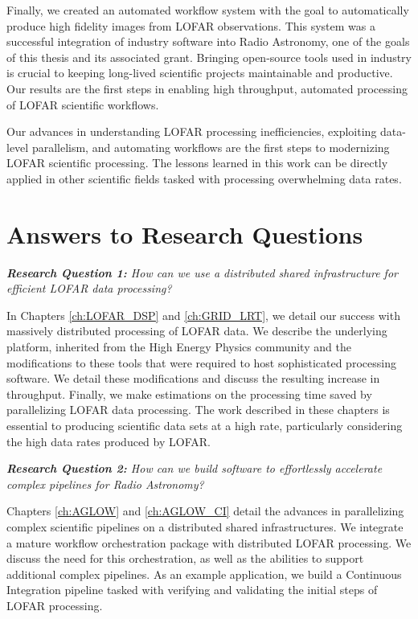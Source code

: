 Finally, we created an automated workflow system with the goal to automatically produce high fidelity images from LOFAR observations. This system was a successful integration of industry software into Radio Astronomy, one of the goals of this thesis and its associated grant. Bringing open-source tools used in industry is crucial to keeping long-lived scientific projects maintainable and productive. Our results are the first steps in enabling high throughput, automated processing of LOFAR scientific workflows. 

Our advances in understanding LOFAR processing inefficiencies, exploiting data-level parallelism, and automating workflows are the first steps to modernizing LOFAR scientific processing. The lessons learned in this work can be directly applied in other scientific fields tasked with processing overwhelming data rates. 

\section{Answers to Research Questions}


\begin{addmargin}[4em]{8em}%
    \emph{\textbf{Research Question 1:} How can we use a distributed shared infrastructure for efficient LOFAR data processing?}
\end{addmargin}

In Chapters \ref{ch:LOFAR_DSP} and \ref{ch:GRID_LRT}, we detail our success with massively distributed processing of LOFAR data. We describe the underlying platform, inherited from the High Energy Physics community and the modifications to these tools that were required to host sophisticated processing software. We detail these modifications and discuss the resulting increase in throughput. Finally, we make estimations on the processing time saved by parallelizing LOFAR data processing. The work described in these chapters is essential to producing scientific data sets at a high rate, particularly considering the high data rates produced by LOFAR. 


\begin{addmargin}[4em]{8em}%
    \emph{\textbf{Research Question 2:}  How can we build software to effortlessly accelerate complex pipelines for Radio Astronomy?} 
\end{addmargin}

Chapters \ref{ch:AGLOW} and \ref{ch:AGLOW_CI} detail the advances in parallelizing complex scientific pipelines on a distributed shared infrastructures. We integrate a mature workflow orchestration package with distributed LOFAR processing. We discuss the need for this orchestration, as well as the abilities to support additional complex pipelines. As an example application, we build a Continuous Integration pipeline tasked with verifying and validating the initial steps of LOFAR processing. 


